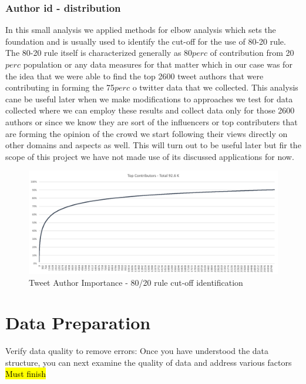 \documentclass[sigconf, nonacm]{acmart}
\begin{document}
\subsubsection{Author id - distribution}
In this small analysis we applied methods for elbow analysis which sets the foundation and is usually used to identify the cut-off for the use of 80-20 rule. The 80-20 rule itself is characterized generally as 80$perc$ of contribution from 20$perc$ population or any data measures for that matter which in our case was for the idea that we were able to find the top 2600 tweet authors that were contributing in forming the 75$perc$ o twitter data that we collected. This analysis cane be useful later when we make modifications to approaches we test for data collected where we can employ these results and collect data only for those 2600 authors or since we know they are sort of the influencers or top contributers that are forming the opinion of the crowd we start following their views directly on other domains and aspects as well. This will turn out to be useful later but fir the scope of this project we have not made use of its discussed applications for now.
\begin{figure}[H]
  \centering
  \includegraphics[width=\linewidth]{images/author.png}
  \caption{Tweet Author Importance - 80/20 rule cut-off identification}
\end{figure}



\section{Data Preparation}
Verify data quality to remove errors: Once you have understood the data structure, you can next examine the quality of data and address various factors
\hl{Must finish}


\end{document}
